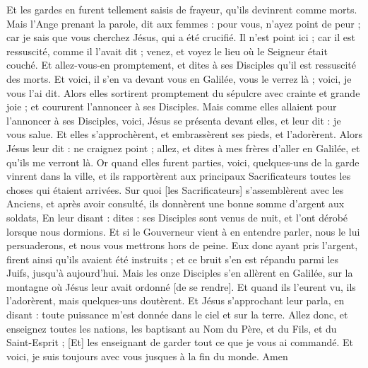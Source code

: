 \begin{multicols}{2}
Et les gardes en furent tellement saisis de frayeur, qu'ils devinrent comme morts.
Mais l'Ange prenant la parole, dit aux femmes : pour vous, n'ayez point de peur ; car je sais que vous cherchez Jésus, qui a été crucifié.
Il n'est point ici ; car il est ressuscité, comme il l'avait dit ; venez, et voyez le lieu où le Seigneur était couché.
Et allez-vous-en promptement, et dites à ses Disciples qu'il est ressuscité des morts. Et voici, il s'en va devant vous en Galilée, vous le verrez là ; voici, je vous l'ai dit.
Alors elles sortirent promptement du sépulcre avec crainte et grande joie ; et coururent l'annoncer à ses Disciples.
Mais comme elles allaient pour l'annoncer à ses Disciples, voici, Jésus se présenta devant elles, et leur dit : je vous salue. Et elles s'approchèrent, et embrassèrent ses pieds, et l'adorèrent.
Alors Jésus leur dit : ne craignez point ; allez, et dites à mes frères d'aller en Galilée, et qu'ils me verront là.
Or quand elles furent parties, voici, quelques-uns de la garde vinrent dans la ville, et ils rapportèrent aux principaux Sacrificateurs toutes les choses qui étaient arrivées.
Sur quoi [les Sacrificateurs] s'assemblèrent avec les Anciens, et après avoir consulté, ils donnèrent une bonne somme d'argent aux soldats,
En leur disant : dites : ses Disciples sont venus de nuit, et l'ont dérobé lorsque nous dormions.
Et si le Gouverneur vient à en entendre parler, nous le lui persuaderons, et nous vous mettrons hors de peine.
Eux donc ayant pris l'argent, firent ainsi qu'ils avaient été instruits ; et ce bruit s'en est répandu parmi les Juifs, jusqu'à aujourd'hui.
Mais les onze Disciples s'en allèrent en Galilée, sur la montagne où Jésus leur avait ordonné [de se rendre].
Et quand ils l'eurent vu, ils l'adorèrent, mais quelques-uns doutèrent.
Et Jésus s'approchant leur parla, en disant : toute puissance m'est donnée dans le ciel et sur la terre.
Allez donc, et enseignez toutes les nations, les baptisant au Nom du Père, et du Fils, et du Saint-Esprit ;
[Et] les enseignant de garder tout ce que je vous ai commandé. Et voici, je suis toujours avec vous jusques à la fin du monde. Amen
\PPE{}
\end{multicols}
